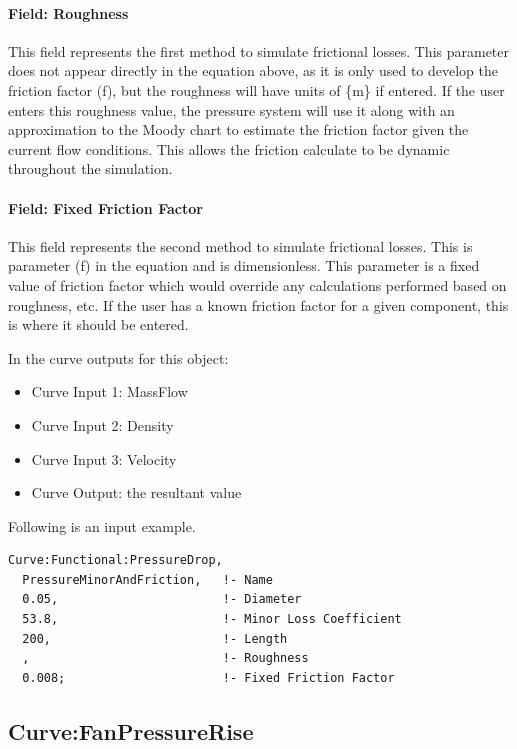 \paragraph{Field: Roughness}\label{field-roughness}

This field represents the first method to simulate frictional losses. This parameter does not appear directly in the equation above, as it is only used to develop the friction factor (f), but the roughness will have units of \{m\} if entered. If the user enters this roughness value, the pressure system will use it along with an approximation to the Moody chart to estimate the friction factor given the current flow conditions. This allows the friction calculate to be dynamic throughout the simulation.

\paragraph{Field: Fixed Friction Factor}\label{field-fixed-friction-factor}

This field represents the second method to simulate frictional losses. This is parameter (f) in the equation and is dimensionless. This parameter is a fixed value of friction factor which would override any calculations performed based on roughness, etc. If the user has a known friction factor for a given component, this is where it should be entered.

In the curve outputs for this object:

\begin{itemize}
\item
  Curve Input 1: MassFlow
\item
  Curve Input 2: Density
\item
  Curve Input 3: Velocity
\item
  Curve Output: the resultant value
\end{itemize}

Following is an input example.

\begin{lstlisting}
Curve:Functional:PressureDrop,
  PressureMinorAndFriction,   !- Name
  0.05,                       !- Diameter
  53.8,                       !- Minor Loss Coefficient
  200,                        !- Length
  ,                           !- Roughness
  0.008;                      !- Fixed Friction Factor
\end{lstlisting}

\subsection{Curve:FanPressureRise}\label{curvefanpressurerise}

